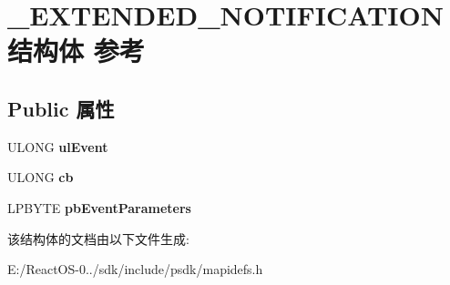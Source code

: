 \hypertarget{struct___e_x_t_e_n_d_e_d___n_o_t_i_f_i_c_a_t_i_o_n}{}\section{\+\_\+\+E\+X\+T\+E\+N\+D\+E\+D\+\_\+\+N\+O\+T\+I\+F\+I\+C\+A\+T\+I\+O\+N结构体 参考}
\label{struct___e_x_t_e_n_d_e_d___n_o_t_i_f_i_c_a_t_i_o_n}
\subsection*{Public 属性}
\begin{DoxyCompactItemize}
\item 
\mbox{\label{struct___e_x_t_e_n_d_e_d___n_o_t_i_f_i_c_a_t_i_o_n_ac31c8495c9ff71f34101f1c668e50961}} 
U\+L\+O\+NG {\bfseries ul\+Event}
\item 
\mbox{\label{struct___e_x_t_e_n_d_e_d___n_o_t_i_f_i_c_a_t_i_o_n_a74c308753665e1b158a0d30cee588ff5}} 
U\+L\+O\+NG {\bfseries cb}
\item 
\mbox{\label{struct___e_x_t_e_n_d_e_d___n_o_t_i_f_i_c_a_t_i_o_n_a55d4c46f4b409d6e47b9138c6c52b884}} 
L\+P\+B\+Y\+TE {\bfseries pb\+Event\+Parameters}
\end{DoxyCompactItemize}


该结构体的文档由以下文件生成\+:\begin{DoxyCompactItemize}
\item 
E\+:/\+React\+O\+S-\/0../sdk/include/psdk/mapidefs.\+h\end{DoxyCompactItemize}
